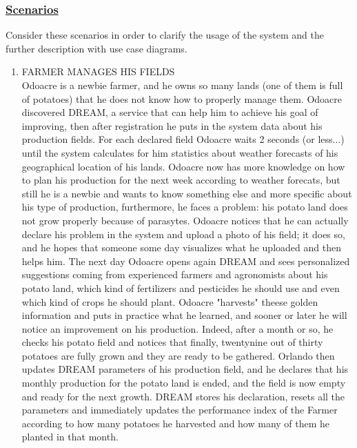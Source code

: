 	\subsubsection[Scenarios]{\hyperlink{toc}{Scenarios}}
		Consider these scenarios in order to clarify the usage of the system and the further description with use case diagrams.
		
		\begin{enumerate}[label=\textbf{SCENARIO \arabic*}]
			\item \label{sce:sce1} FARMER MANAGES HIS FIELDS \\ 
			Odoacre is a newbie farmer, and he owns so many lands (one of them is full of potatoes) that he does not know how to properly manage them. Odoacre discovered DREAM, a service that can help him to achieve his goal of improving, then after registration he puts in the system data about his production fields. For each declared field Odoacre waits 2 seconds (or less...)
			until the system calculates for him statistics about weather forecasts of his geographical location of his lands.
			Odoacre now has more knowledge on how to plan his production for the next week according to weather forecats, but still
			he is a newbie and wants to know something else and more specific about his type of production, furthermore, he faces a problem: his potato land does not grow properly because of parasytes.
			Odoacre notices that he can actually declare his problem in the system and upload a photo of his field; it does so, and he hopes that someone some day visualizes what he uploaded and then helps him.
			The next day Odoacre opens again DREAM and sees personalized suggestions coming from experienced farmers and agronomists about his potato land, which kind of fertilizers and pesticides he should use and even which kind of crops he should plant.
			Odoacre "harvests" theese golden information and puts in practice what he learned, and sooner or later he will notice an improvement on his production. Indeed, after a month or so, he checks his potato field and notices that finally, twentynine out of thirty potatoes are fully grown and they are ready to be gathered. Orlando then updates DREAM parameters of his production field, and he declares that his monthly production for the potato land is ended, and the field is now empty and ready for the next growth. DREAM stores his declaration, resets all the parameters and immediately updates the performance index of the Farmer according to how many potatoes he harvested and
			how many of them he planted in that month.
			

\end{enumerate}
